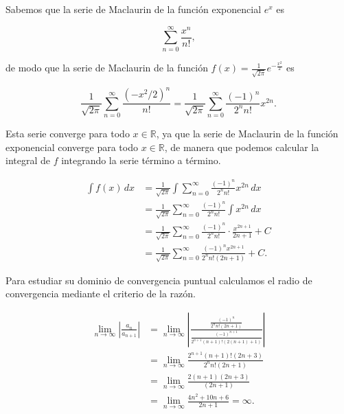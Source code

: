 \documentclass[
  a4paper,
]{scrreport}
\theoremstyle{definition}
\theoremstyle{remark}
\begin{document}
\begin{tcolorbox}[enhanced jigsaw, opacityback=0, bottomtitle=1mm, coltitle=black, opacitybacktitle=0.6, colback=white, breakable, left=2mm, titlerule=0mm, bottomrule=.15mm, colbacktitle=quarto-callout-tip-color!10!white, toprule=.15mm, leftrule=.75mm, arc=.35mm, toptitle=1mm, colframe=quarto-callout-tip-color-frame, title=\textcolor{quarto-callout-tip-color}{\faLightbulb}\hspace{0.5em}{Solución}, rightrule=.15mm]

Sabemos que la serie de Maclaurin de la función exponencial \(e^x\) es

\[
\sum_{n=0}^\infty \frac{x^n}{n!},
\]

de modo que la serie de Maclaurin de la función
\(f(x) = \frac{1}{\sqrt{2\pi}}e^{-\frac{x^2}{2}}\) es

\[
\frac{1}{\sqrt{2\pi}}\sum_{n=0}^\infty \frac{(-x^2/2)^n}{n!}
= \frac{1}{\sqrt{2\pi}}\sum_{n=0}^\infty \frac{(-1)^n}{2^n n!} x^{2n}.
\]

Esta serie converge para todo \(x \in \mathbb{R}\), ya que la serie de
Maclaurin de la función exponencial converge para todo
\(x \in \mathbb{R}\), de manera que podemos calcular la integral de
\(f\) integrando la serie término a término.

\begin{align*}
\int f(x)\,dx 
&= \frac{1}{\sqrt{2\pi}}\int \sum_{n=0}^\infty \frac{(-1)^n}{2^n n!} x^{2n}\,dx \\
&= \frac{1}{\sqrt{2\pi}}\sum_{n=0}^\infty \frac{(-1)^n}{2^n n!} \int x^{2n}\,dx \\
&= \frac{1}{\sqrt{2\pi}}\sum_{n=0}^\infty \frac{(-1)^n}{2^n n!} \cdot \frac{x^{2n+1}}{2n+1} + C \\
&= \frac{1}{\sqrt{2\pi}}\sum_{n=0}^\infty \frac{(-1)^n x^{2n+1}}{2^n n!(2n+1)} + C.
\end{align*}

Para estudiar su dominio de convergencia puntual calculamos el radio de
convergencia mediante el criterio de la razón.

\begin{align*}
\lim_{n \to \infty} \left| \frac{a_n}{a_{n+1}} \right|
&= \lim_{n \to \infty} \left| \frac{\frac{(-1)^n}{2^n n!(2n+1)}}{\frac{(-1)^{n+1}}{2^{n+1} (n+1)!(2(n+1)+1)}} \right| \\
&= \lim_{n \to \infty} \frac{2^{n+1} (n+1)!(2n+3)}{2^n n!(2n+1)}\\
&= \lim_{n \to \infty} \frac{2(n+1)(2n+3)}{(2n+1)} \\
&= \lim_{n \to \infty} \frac{4n^2+10n+6}{2n+1} 
= \infty.
\end{align*}


\end{tcolorbox}
\end{document}
